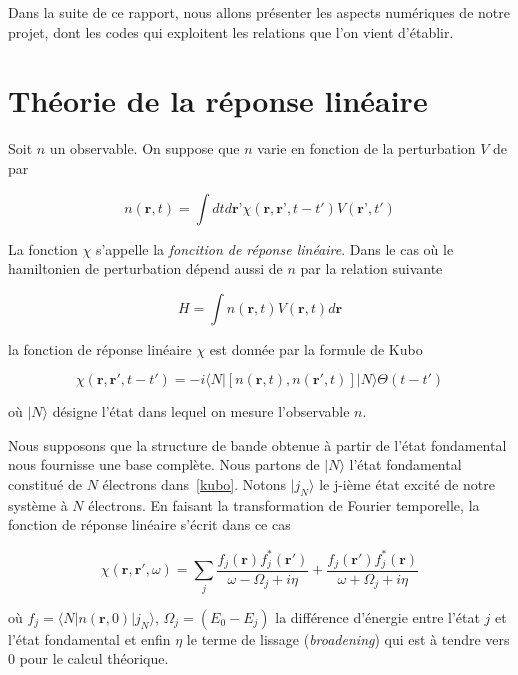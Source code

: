 \documentclass[12pt, french]{report}
\theoremstyle{theoreme}
\begin{document}
Dans la suite de ce rapport, nous allons présenter les aspects numériques de notre projet, dont les codes qui exploitent les relations que l'on vient d'établir.





\appendix
\chapter{Théorie de la réponse linéaire}\label{TRL}
Soit $n$ un observable. On suppose que $n$ varie en fonction de la perturbation $V$ de par

$$
n(\textbf{r}, t) = \int dt d\textbf{r'}  \chi (\textbf{r}, \textbf{r'}, t-t') V(\textbf{r'}, t')
$$

La fonction $\chi$ s'appelle la \textit{foncition de réponse linéaire}. Dans le cas où le hamiltonien de perturbation dépend aussi de $n$ par la relation suivante

$$
H = \int n(\textbf{r}, t) V(\textbf{r}, t) d\textbf{r}
$$

la fonction de réponse linéaire $\chi$ est donnée par la formule de Kubo\cite{Ton12}

\begin{equation}\label{kubo}
  \chi (\textbf{r}, \textbf{r}', t-t') = -i \langle N | [n(\textbf{r}, t), n(\textbf{r}', t)] |N \rangle \Theta(t-t')
\end{equation}

où $|N \rangle $ désigne l'état dans lequel on mesure l'observable $n$.

Nous supposons que la structure de bande obtenue à partir de l'état fondamental nous fournisse une base complète. Nous partons de $|N \rangle$ l'état fondamental constitué de $N$ électrons dans~\ref{kubo}. Notons $| j_N \rangle $ le j-ième état excité de notre système à $N$ électrons. En faisant la transformation de Fourier temporelle, la fonction de réponse linéaire s'écrit dans ce cas

\begin{equation}
\chi (\textbf{r}, \textbf{r}', \omega) = \sum_j \frac{f_j(\textbf{r}) f_j^*(\textbf{r}') }{\omega - \Omega_j + i \eta} + \frac{f_j(\textbf{r}') f_j^*(\textbf{r}) }{\omega + \Omega_j + i \eta}
\end{equation}

où $f_j = \langle N | n(\textbf{r}, 0) | j_N \rangle$, $\Omega_j = (E_0 - E_j)$ la différence d'énergie entre l'état $j$ et l'état fondamental et enfin $\eta$ le terme de lissage (\textit{broadening}) qui est à tendre vers 0 pour le calcul théorique.
\end{document}
